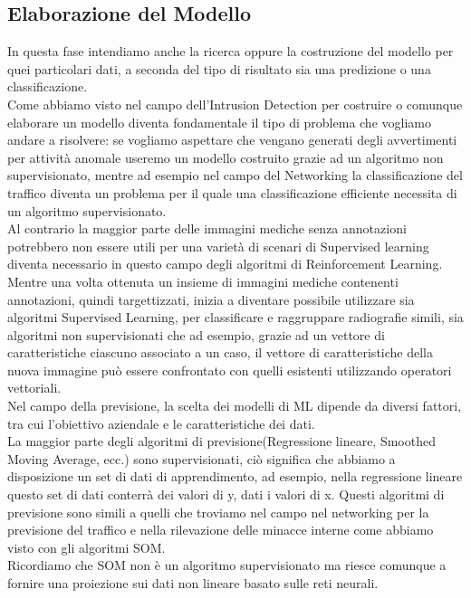 \documentclass[../tesi.tex]{subfiles}
\begin{document}
\subsection{Elaborazione del Modello}
In questa fase intendiamo anche la ricerca oppure la costruzione del modello per quei particolari dati, a seconda del tipo di risultato sia una predizione o una classificazione.\\
Come abbiamo visto nel campo dell’Intrusion Detection per costruire o comunque elaborare un modello diventa fondamentale il tipo di problema che vogliamo andare a risolvere:
se vogliamo aspettare che vengano generati degli avvertimenti per attività anomale useremo un modello costruito grazie ad un algoritmo non supervisionato, mentre ad esempio nel campo del Networking la classificazione del traffico diventa un problema per il quale una classificazione efficiente necessita di un algoritmo supervisionato.\\
Al contrario la maggior parte delle immagini mediche senza annotazioni potrebbero non essere utili per una varietà di scenari di Supervised learning diventa necessario in questo campo degli algoritmi di Reinforcement Learning.\\
Mentre una volta ottenuta un insieme di immagini mediche contenenti annotazioni, quindi targettizzati, inizia a diventare possibile utilizzare sia algoritmi Supervised Learning, per classificare e raggruppare radiografie simili, sia algoritmi non supervisionati che ad esempio, grazie ad un vettore di caratteristiche ciascuno associato a un caso, il vettore di caratteristiche della nuova immagine può essere confrontato con quelli esistenti utilizzando operatori vettoriali.\\
Nel campo della previsione, la scelta dei modelli di ML dipende da diversi fattori, tra cui l’obiettivo aziendale e le caratteristiche dei dati.\\
La maggior parte degli algoritmi di previsione(Regressione lineare, Smoothed Moving Average, ecc.) sono supervisionati, ciò significa che abbiamo a disposizione un set di dati di apprendimento, ad esempio, nella regressione lineare questo set di dati conterrà dei valori di y, dati i valori di x. Questi algoritmi di previsione sono simili a quelli che troviamo nel campo nel networking per la previsione del traffico e nella rilevazione delle minacce interne come abbiamo visto con gli algoritmi SOM.\\
Ricordiamo che SOM non è un algoritmo supervisionato ma riesce comunque a fornire una proiezione sui dati non lineare basato sulle reti neurali.
\newpage
\end{document}
